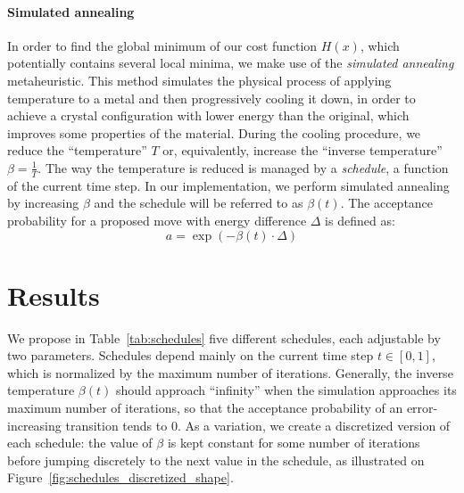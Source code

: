 \documentclass{article}
\begin{document}
  \paragraph{Simulated annealing}
  In order to find the global minimum of our cost function $H(x)$, which potentially contains several local minima, we make use of the \textit{simulated annealing} metaheuristic. This method simulates the physical process of applying temperature to a metal and then progressively cooling it down, in order to achieve a crystal configuration with lower energy than the original, which improves some properties of the material. During the cooling procedure, we reduce the ``temperature'' $T$ or, equivalently, increase the ``inverse temperature'' $\beta=\frac{1}{T}$. The way the temperature is reduced is managed by a \emph{schedule}, a function of the current time step. In our implementation, we perform simulated annealing by increasing $\beta$ and the schedule will be referred to as $\beta(t)$. The acceptance probability for a proposed move with energy difference $\Delta$ is defined as:
  \[
    a = \exp(- \beta(t) \cdot \Delta)
  \]

  \section*{Results}

  We propose in Table~\ref{tab:schedules} five different schedules, each adjustable by two parameters. Schedules depend mainly on the current time step $t \in [0, 1]$, which is normalized by the maximum number of iterations. Generally, the inverse temperature $\beta(t)$ should approach ``infinity'' when the simulation approaches its maximum number of iterations, so that the acceptance probability of an error-increasing transition tends to $0$. As a variation, we create a discretized version of each schedule: the value of $\beta$ is kept constant for some number of iterations before jumping discretely to the next value in the schedule, as illustrated on Figure~\ref{fig:schedules_discretized_shape}.
\end{document}

